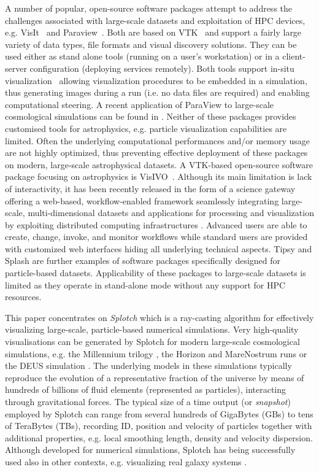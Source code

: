 \documentclass[1p]{elsarticle}
\begin{document}
A number of popular, open-source software packages attempt to address the challenges associated with large-scale datasets and exploitation of HPC devices, e.g. VisIt~\cite{visit} and Paraview~\cite{paraview}. Both are based on VTK~\cite{vtk} and support a fairly large variety of data types, file formats and visual discovery solutions. They can be used either as stand alone tools (running on a user's workstation) or in a client-server configuration (deploying services remotely). Both tools support in-situ visualization~\cite{in-situ} allowing visualization procedures to be embedded in a simulation, thus generating images during a run (i.e. no data files are required) and enabling computational steering. A recent application of ParaView to large-scale cosmological simulations can be found in \cite{2011ApJS..195...11W}. Neither of these packages provides customised tools for astrophysics,  e.g. particle visualization capabilities are limited. Often the underlying computational performances and/or memory usage are not highly optimized, thus preventing effective deployment of these packages on modern, large-scale astrophysical datasets. A VTK-based open-source software package focusing on astrophysics is VisIVO~\cite{visivo}. Although its main limitation is lack of interactivity, it has been recently released in the form of a science gateway offering a web-based, workflow-enabled framework seamlessly integrating large-scale, multi-dimensional datasets and applications for processing and visualization by exploiting distributed computing infrastructures \cite{VisIVOGateway}. Advanced users are able to create, change, invoke, and monitor workflows while standard users are provided with customized web interfaces hiding all underlying technical aspects. Tipsy \cite{tipsyurl} and Splash \cite{splash} are further examples of software packages specifically designed for particle-based datasets. Applicability of these packages to large-scale datasets is limited as they operate in stand-alone mode without any support for HPC resources.

This paper concentrates on {\it Splotch} \cite{2008NJPh...10l5006D} which is a ray-casting algorithm for effectively visualizing large-scale, particle-based numerical simulations. Very high-quality visualisations can be generated by Splotch for modern large-scale cosmological simulations, e.g. the Millennium trilogy \cite{millennium}, the Horizon and MareNostrum runs \cite{horizon} or the DEUS simulation \cite{deus}. The underlying models in these simulations typically reproduce the evolution of a representative fraction of the universe by means of hundreds of billions of fluid elements (represented as particles), interacting through gravitational forces. The typical size of a time output (or {\it snapshot}) employed by Splotch can range from several hundreds of GigaBytes (GBs) to tens of TeraBytes (TBs), recording ID, position and velocity of particles together with additional properties, e.g. local smoothing length, density and velocity dispersion. Although developed for numerical simulations, Splotch has being successfully used 
also in other contexts, e.g. visualizing real galaxy systems \cite{}.
\end{document}
